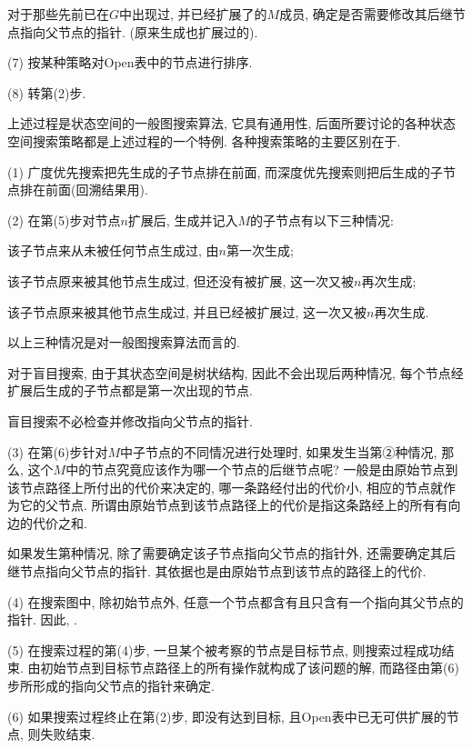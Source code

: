     \quad \quad {} 对于那些先前已在$G$中出现过, 并已经扩展了的$M$成员, 确定是否需要修改其后继节点指向父节点的指针. (原来生成也扩展过的).

\quad (7) 按某种策略对Open表中的节点进行排序.

\quad (8) 转第(2)步.
\begin{remark}
    上述过程是状态空间的一般图搜索算法, 它具有通用性, 后面所要讨论的各种状态空间搜索策略都是上述过程的一个特例. 各种搜索策略的主要区别在于.
\end{remark}

\begin{remark}

(1) 广度优先搜索把先生成的子节点排在前面, 而深度优先搜索则把后生成的子节点排在前面(回溯结果用).

(2) 在第(5)步对节点$n$扩展后, 生成并记入$M$的子节点有以下三种情况:

    \quad {} 该子节点来从未被任何节点生成过, 由$n$第一次生成;

    \quad {} 该子节点原来被其他节点生成过, 但还没有被扩展, 这一次又被$n$再次生成;

    \quad {} 该子节点原来被其他节点生成过, 并且已经被扩展过, 这一次又被$n$再次生成.

以上三种情况是对一般图搜索算法而言的.

对于盲目搜索, 由于其状态空间是树状结构, 因此不会出现后两种情况, 每个节点经扩展后生成的子节点都是第一次出现的节点.

\begin{tcolorbox}
    盲目搜索不必检查并修改指向父节点的指针.
\end{tcolorbox}

(3) 在第(6)步针对$M$中子节点的不同情况进行处理时, 如果发生当第②种情况, 那么, 这个$M$中的节点究竟应该作为哪一个节点的后继节点呢?
一般是由原始节点到该节点路径上所付出的代价来决定的, 哪一条路经付出的代价小, 相应的节点就作为它的父节点. 所谓由原始节点到该节点路径上的代价是指这条路经上的所有有向边的代价之和.

如果发生第种情况, 除了需要确定该子节点指向父节点的指针外, 还需要确定其后继节点指向父节点的指针. 其依据也是由原始节点到该节点的路径上的代价.

(4) 在搜索图中, 除初始节点外, 任意一个节点都含有且只含有一个指向其父节点的指针. 因此, .

(5) 在搜索过程的第(4)步, 一旦某个被考察的节点是目标节点, 则搜索过程成功结束. 由初始节点到目标节点路径上的所有操作就构成了该问题的解, 而路径由第(6)步所形成的指向父节点的指针来确定.

(6) 如果搜索过程终止在第(2)步, 即没有达到目标, 且\textup{Open}表中已无可供扩展的节点, 则失败结束.
\end{remark}
